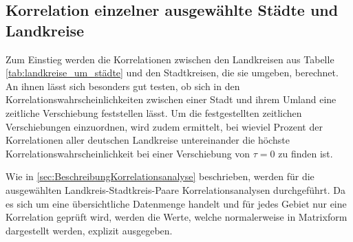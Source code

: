 \subsection{Korrelation einzelner ausgewählte Städte und Landkreise}\label{sec:selected_counties}
Zum Einstieg werden die Korrelationen zwischen den Landkreisen aus Tabelle \ref{tab:landkreise_um_städte} und den Stadtkreisen, die sie umgeben, berechnet.
An ihnen lässt sich besonders gut testen, ob sich in den Korrelationswahrscheinlichkeiten zwischen einer Stadt und ihrem Umland eine zeitliche Verschiebung feststellen lässt.
Um die festgestellten zeitlichen Verschiebungen einzuordnen, wird zudem ermittelt, bei wieviel Prozent der Korrelationen aller deutschen Landkreise untereinander die höchste Korrelationswahrscheinlichkeit bei einer Verschiebung von $\tau = 0$ zu finden ist.

Wie in \autoref{sec:BeschreibungKorrelationsanalyse} beschrieben, werden für die ausgewählten Landkreis-Stadtkreis-Paare Korrelationsanalysen durchgeführt. Da es sich um eine übersichtliche Datenmenge handelt und für jedes Gebiet nur eine Korrelation geprüft wird, werden die Werte, welche normalerweise in Matrixform dargestellt werden, explizit ausgegeben.

